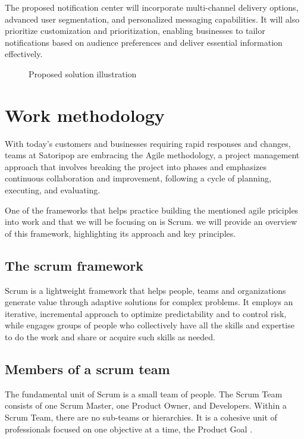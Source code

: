 The proposed notification center will incorporate multi-channel delivery options, advanced user
segmentation, and personalized messaging capabilities. It will also prioritize customization and
prioritization, enabling businesses to tailor notifications based on audience preferences and deliver
essential information effectively.\\

\begin{figure}[hbt!]
      \centering
      
      \caption{Proposed solution illustration}
      \label{solution}
\end{figure}

\section{Work methodology}
With today’s customers and businesses requiring rapid responses and changes, teams at Satoripop are embracing
the Agile methodology, a project management approach that involves breaking the project into phases
and emphasizes continuous collaboration and improvement, following a cycle of planning, executing,
and evaluating.

One of the frameworks that helps practice building the mentioned agile priciples into work and that we will
be focusing on is Scrum. we will provide an overview of this framework, highlighting its approach and
key principles.

\subsection{The scrum framework}
Scrum is a lightweight framework that helps people, teams and organizations generate value through adaptive
solutions for complex problems. It employs an iterative, incremental approach to optimize predictability
and to control risk, while engages groups of people who collectively have all the skills and expertise
to do the work and share or acquire such skills as needed.

\subsection{Members of a scrum team }
The fundamental unit of Scrum is a small team of people. The Scrum Team consists of
one Scrum Master, one Product Owner, and Developers. Within a Scrum Team, there are no sub-teams
or hierarchies. It is a cohesive unit of professionals focused on one objective at a time,
the Product Goal \cite{scrumguides}.

